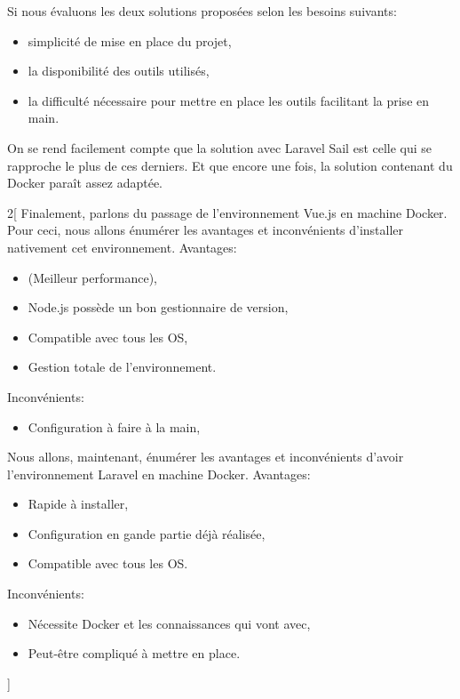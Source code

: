\documentclass[
    iai, %
    il, %
]{heig-tb}
\begin{document}
Si nous évaluons les deux solutions proposées selon les besoins suivants:
\begin{itemize}
    \item simplicité de mise en place du projet,
    \item la disponibilité des outils utilisés,
    \item la difficulté nécessaire pour mettre en place les outils facilitant la prise en main.
\end{itemize}

On se rend facilement compte que la solution avec Laravel Sail est celle qui se rapproche le plus de ces derniers. Et que encore une fois, la solution contenant du Docker paraît assez adaptée.


\begin{multicols}{2}[
        Finalement, parlons du passage de l'environnement Vue.js en machine Docker.
        Pour ceci, nous allons énumérer les avantages et inconvénients d'installer nativement cet environnement.
        Avantages:
        \begin{itemize}
            \item (Meilleur performance),
            \item Node.js possède un bon gestionnaire de version,
            \item Compatible avec tous les OS,
            \item Gestion totale de l'environnement.
        \end{itemize}

        Inconvénients:
        \begin{itemize}
            \item Configuration à faire à la main,
        \end{itemize}

        Nous allons, maintenant, énumérer les avantages et inconvénients d'avoir l'environnement Laravel en machine Docker.
        Avantages:
        \begin{itemize}
            \item Rapide à installer,
            \item Configuration en gande partie déjà réalisée,
            \item Compatible avec tous les OS.
        \end{itemize}

        Inconvénients:
        \begin{itemize}
            \item Nécessite Docker et les connaissances qui vont avec,
            \item Peut-être compliqué à mettre en place.
        \end{itemize}
    ]
    \blindtext\blindtext
\end{multicols}
\end{document}
